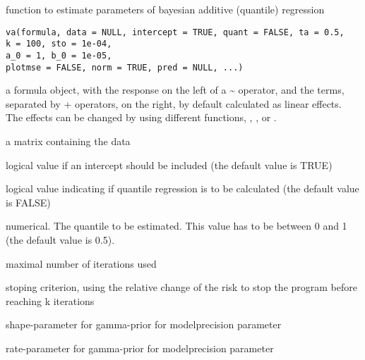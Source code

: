 \documentclass[a4paper]{book}
\begin{document}
%
\begin{Description}\relax

function to estimate parameters of bayesian additive (quantile) regression
\end{Description}
%
\begin{Usage}
\begin{verbatim}
va(formula, data = NULL, intercept = TRUE, quant = FALSE, ta = 0.5,
k = 100, sto = 1e-04,
a_0 = 1, b_0 = 1e-05, 
plotmse = FALSE, norm = TRUE, pred = NULL, ...)
\end{verbatim}
\end{Usage}
%
\begin{Arguments}
\begin{ldescription}
\item[\code{formula}] 
a formula object, with the response on the left of a \textasciitilde{} operator, and the terms, separated by + operators, on the right, by default calculated as linear effects. The effects can be changed by using different functions, , ,  or .



\item[\code{data}] 
a matrix containing the data


\item[\code{intercept}] 
logical value if an intercept should be included (the default value is TRUE)



\item[\code{quant}] 
logical value indicating if quantile regression is to be calculated (the default value is FALSE)


\item[\code{ta}] 
numerical. The quantile to be estimated. This value has to be between 0 and 1 (the default value is 0.5).


\item[\code{k}] 
maximal number of iterations used


\item[\code{sto}] 
stoping criterion, using the relative change of the risk to stop the program before reaching k iterations


\item[\code{a\_0}] 
shape-parameter for gamma-prior for modelprecision parameter


\item[\code{b\_0}] 
rate-parameter for gamma-prior for modelprecision parameter



\end{ldescription}
\end{Arguments}
\end{document}
